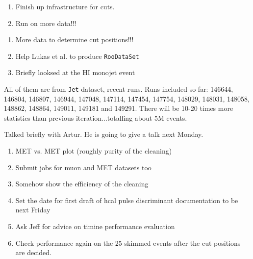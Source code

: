 

\begin{enumerate}
\item Finish up infrastructure for cuts.
\item Run on more data!!!
\end{enumerate}


\begin{enumerate}
\item More data to determine cut positions!!!
\item Help Lukas et al. to produce \texttt{RooDataSet}
\item Briefly looksed at the HI monojet event
\end{enumerate}


All of them are from \texttt{Jet} dataset, recent runs.  Runs included so far:
146644, 146804, 146807, 146944, 147048, 147114, 147454, 147754, 148029, 148031, 148058, 148862, 148864,
149011, 149181 and 149291.  There will be 10-20 times more statistics than previous iteration...totalling about 5M events.


Talked briefly with Artur.  He is going to give a talk next Monday.

\begin{enumerate}
\item MET vs. MET plot (roughly purity of the cleaning)
\item Submit jobs for muon and MET datasets too
\item Somehow show the efficiency of the cleaning
\item Set the date for first draft of hcal pulse discriminant documentation to be next Friday
\item Ask Jeff for advice on timine performance evaluation
\item Check performance again on the 25 skimmed events after the cut positions are decided.
\end{enumerate}



